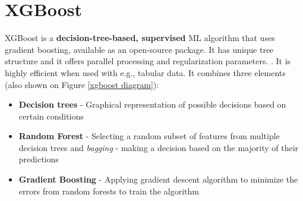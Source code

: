 \section{XGBoost}
XGBoost  is a \textbf{decision-tree-based, supervised} ML algorithm that uses gradient boosting, available as an open-source package. 
It has unique tree structure and it offers parallel processing and regularization parameters. \cite{xgboost}. It is highly efficient when used with e.g., tabular data. \cite{shahid} It combines three elements (also shown on Figure \ref{xgboost diagram}): 
\begin{itemize}
    \item \textbf{Decision trees} - Graphical representation of possible decisions based on certain conditions
    \item \textbf{Random Forest} - Selecting a random subset of features from multiple decision trees and \emph{bagging} - making a decision based on the majority of their predictions
    \item \textbf{Gradient Boosting} - Applying gradient descent algorithm to minimize the errors from random forests to train the algorithm \cite{xgboost1}\\
\end{itemize}


